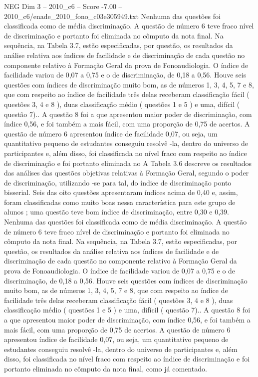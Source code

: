 \begin{textsample}{NEG Dim 3 – 2010\_c6 – Score -7.00 – 2010\_c6/enade\_2010\_fono\_c03e305949.txt}
Nenhuma das questões foi classificada como de média discriminação.
A questão de número 6 teve fraco nível de discriminação e portanto foi eliminada no cômputo da nota final.
Na sequência, na Tabela 3.7, estão especificadas, por questão, os resultados da análise relativa aos índices de facilidade e de discriminação de cada questão no componente relativo à Formação Geral da prova de Fonoaudiologia.
O índice de facilidade variou de 0,07 a 0,75 e o de discriminação, de 0,18 a 0,56.
Houve seis questões com índices de discriminação muito bom, as de números 1, 3, 4, 5, 7 e 8, que com respeito ao índice de facilidade três delas receberam classificação fácil ( questões 3, 4 e 8 ), duas classificação médio ( questões 1 e 5 ) e uma, difícil ( questão 7)..
A questão 8 foi a que apresentou maior poder de discriminação, com índice 0,56, e foi também a mais fácil, com uma proporção de 0,75 de acertos.
A questão de número 6 apresentou índice de facilidade 0,07, ou seja, um quantitativo pequeno de estudantes conseguiu resolvê -la, dentro do universo de participantes e, além disso, foi classificada no nível fraco com respeito ao índice de discriminação e foi portanto eliminada no A Tabela 3.6 descreve os resultados das análises das questões objetivas relativas à Formação Geral, segundo o poder de discriminação, utilizando -se para tal, do índice de discriminação ponto bisserial.
Seis das oito questões apresentaram índices acima de 0,40 e, assim, foram classificadas como muito boas nessa característica para este grupo de alunos ; uma questão teve bom índice de discriminação, entre 0,30 e 0,39.
Nenhuma das questões foi classificada como de média discriminação.
A questão de número 6 teve fraco nível de discriminação e portanto foi eliminada no cômputo da nota final.
Na sequência, na Tabela 3.7, estão especificadas, por questão, os resultados da análise relativa aos índices de facilidade e de discriminação de cada questão no componente relativo à Formação Geral da prova de Fonoaudiologia.
O índice de facilidade variou de 0,07 a 0,75 e o de discriminação, de 0,18 a 0,56.
Houve seis questões com índices de discriminação muito bom, as de números 1, 3, 4, 5, 7 e 8, que com respeito ao índice de facilidade três delas receberam classificação fácil ( questões 3, 4 e 8 ), duas classificação médio ( questões 1 e 5 ) e uma, difícil ( questão 7)..
A questão 8 foi a que apresentou maior poder de discriminação, com índice 0,56, e foi também a mais fácil, com uma proporção de 0,75 de acertos.
A questão de número 6 apresentou índice de facilidade 0,07, ou seja, um quantitativo pequeno de estudantes conseguiu resolvê -la, dentro do universo de participantes e, além disso, foi classificada no nível fraco com respeito ao índice de discriminação e foi portanto eliminada no cômputo da nota final, como já comentado.

\end{textsample}
